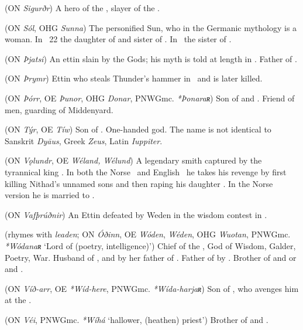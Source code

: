 \begin{itemize}
 (ON \emph{Sigurðr})
  A hero of the , slayer of the  .

 (ON \emph{Sól}, OHG \emph{Sunna})
  The personified Sun, who in the Germanic mythology is a woman.  In \Vafthrudnismal\ 22 the daughter of  and sister of .  In \MerseburgTwo\ the sister of .

 (ON \emph{Þjatsi})
  An ettin slain by the Gods; his myth is told at length in \Haustlong.  Father of .

 (ON \emph{Þrymr})
  Ettin who steals Thunder’s hammer in \Thrymskvida\ and is later killed.

 (ON \emph{Þórr}, OE \emph{Þunor}, OHG \emph{Donar}, PNWGmc. \emph{*Þonaraʀ})
  Son of  and .  Friend of men, guarding of Middenyard.

 (ON \emph{Týr}, OE \emph{Tíw})
  Son of .  One-handed god.  The name is not identical to Sanskrit \emph{Dyāus}, Greek \emph{Zeus}, Latin \emph{Iuppiter}.

 (ON \emph{Vǫlundr}, OE \emph{Wéland, Wélund})
  A legendary smith captured by the tyrannical king .  In both the Norse \Volundarkvida\ and English \Deor\ he takes his revenge by first killing Nithad’s unnamed sons and then raping his daughter .  In the Norse version he is married to .

 (ON \emph{Vafþrúðnir})
  An Ettin defeated by Weden in the wisdom contest in \Vafthrudnismal.

 (rhymes with \emph{leaden}; ON \emph{Óðinn}, OE \emph{Wóden}, \emph{Wéden}, OHG \emph{Wuotan}, PNWGmc. \emph{*Wódanaʀ} ‘Lord of  (poetry, intelligence)’)
  Chief of the , God of Wisdom, Galder, Poetry, War.  Husband of , and by her father of .  Father of  by .  Brother of  and  or  and .

 (ON \emph{Víð-arr}, OE \emph{*Wíd-here}, PNWGmc. \emph{*Wída-harjaʀ})
  Son of , who avenges him at the .

 (ON \emph{Véi}, PNWGmc. \emph{*Wíhá} ‘hallower, (heathen) priest’)
  Brother of  and .


\end{itemize}
